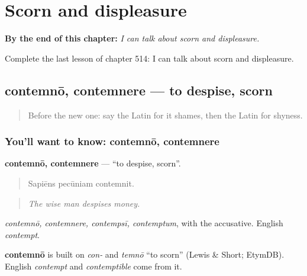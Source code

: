 
\chapter{Scorn and displeasure}
\label{ch:la-scorn-and-displeasure}

\begin{chapteropening}
\textbf{By the end of this chapter:} \emph{I can talk about scorn and displeasure.}

Complete the last lesson of chapter 514: I can talk about scorn and displeasure.
\end{chapteropening}

\section[contemnō, contemnere]{contemnō, contemnere — to despise, scorn}

\label{lesson:LA-C514-contemno}



\begin{quote}
Before the new one: say the Latin for it shames, then the Latin for shyness.
\end{quote}

\subsection*{You'll want to know: contemnō, contemnere}
\textbf{contemnō, contemnere} — \textquotedblleft{}to despise, scorn\textquotedblright{}.

\begin{quote}
Sapiēns pecūniam contemnit.
\end{quote}

\begin{quote}
\emph{The wise man despises money.}
\end{quote}

\emph{contemnō, contemnere, contempsī, contemptum}, with the accusative. English \emph{contempt}.

\begin{cousinweb}
\textbf{contemnō} is built on \emph{con-} and \emph{temnō} \textquotedblleft{}to scorn\textquotedblright{} (Lewis \& Short; EtymDB). English \emph{contempt} and \emph{contemptible} come from it.
\end{cousinweb}

